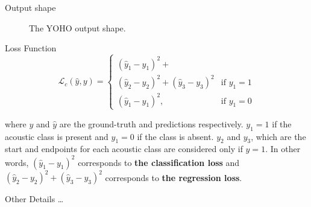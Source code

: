 \begin{frame}{Output shape}
\begin{figure}
			\caption{The YOHO output shape.}
			\label{fig:YOHOoutput}
		\end{figure}
		
	\end{frame}
	

	\begin{frame}{Loss Function}
		\begin{equation*}
			\mathcal{L}_{c}(\hat{y},y) = \begin{cases}
			(\hat{y}_1-y_1)^2+\\(\hat{y}_2-y_2)^2+(\hat{y}_3-y_3)^2 &\text{if $y_{1} = 1$}\\
			(\hat{y}_1-y_1)^2, &\text{if $y_1 = 0$}
			\end{cases}
		\end{equation*}
		
		where $y$ and $\hat{y}$ are the ground-truth and predictions respectively. $y_1 = 1$ if the acoustic class is present and $y_1 = 0$ if the class is absent. $y_2$ and $y_3$, which are the start and endpoints for each acoustic class are considered only if $y = 1$.
		In other words, $(\hat{y}_1-y_1)^2$ corresponds to \textbf{the classification loss} and $(\hat{y}_2-y_2)^2+(\hat{y}_3-y_3)^2$ corresponds to \textbf{the regression loss}.
		\note{
			\dots
		}
	\end{frame}
	
	\begin{frame}{Other Details}
		\dots
		
		\note{
			\dots
		}
	\end{frame}


